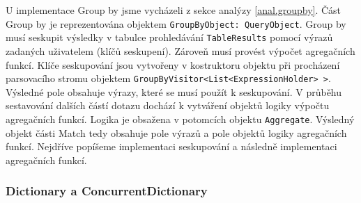 U implementace Group by jsme vycházeli z sekce analýzy \ref{anal.groupby}.
Část Group by je reprezentována objektem \texttt{GroupByObject: QueryObject}.
Group by musí seskupit výsledky v tabulce prohledávání \texttt{TableResults} pomocí výrazů zadaných uživatelem (klíčů seskupení).
Zároveň musí provést výpočet agregačních funkcí.
Klíče seskupování jsou vytvořeny v kostruktoru objektu při procházení parsovacího stromu objektem \texttt{GroupByVisitor<List<ExpressionHolder> >}.
Výsledné pole obsahuje výrazy, které se musí použít k seskupování.
V průběhu sestavování dalších částí dotazu dochází k vytváření objektů logiky výpočtu agregačních funkcí.
Logika je obsažena v potomcích objektu \texttt{Aggregate}.
Výsledný objekt části Match tedy obsahuje pole výrazů a pole objektů logiky agregačních funkcí.
Nejdříve popíšeme implementaci seskupování a následně implementaci agregačních funkcí.

\subsubsection{Dictionary a ConcurrentDictionary}

